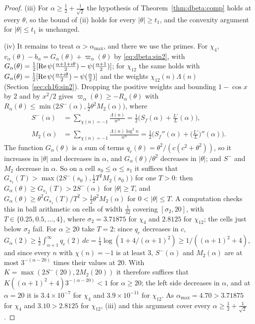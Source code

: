 \begin{proof}
(iii) For $\alpha\ge\frac12+\frac1{\sqrt2}$ the hypothesis of Theorem~\ref{thm:dbeta:comp} holds at every $\theta$, so the bound of (ii) holds for every $|\theta|\ge t_1$, and the convexity argument for $|\theta|\le t_1$ is unchanged.

(iv) It remains to treat $\alpha>\alpha_{\max}$, and there we use the primes. For $\chi_4$, $v_\alpha(\theta)-b_\alpha=G_\alpha(\theta)+\varpi_\alpha(\theta)$ by \eqref{eq:dbeta:sin2}, with $G_\alpha(\theta)=\frac12[\operatorname{Re}\psi(\frac{\alpha+1+i\theta}2)-\psi(\frac{\alpha+1}2)]$; for $\chi_{12}$ the same holds with $G_\alpha(\theta)=\frac12[\operatorname{Re}\psi(\frac{\alpha+i\theta}2)-\psi(\frac\alpha2)]$ and the weights $\chi_{12}(n)\Lambda(n)$ (Section~\ref{sec:ch16:sin2}). Dropping the positive weights and bounding $1-\cos x$ by $2$ and by $x^2/2$ gives $\varpi_\alpha(\theta)\ge-R_\alpha(\theta)$ with $R_\alpha(\theta)\le\min\big(2S^-(\alpha),\frac12\theta^2M_2(\alpha)\big)$, where
\begin{align*}
S^-(\alpha)&=\sum_{\chi(n)=-1}\frac{\Lambda(n)}{n^\alpha}=\frac12\Big(S_f(\alpha)+\frac{L'}L(\alpha)\Big),\\
M_2(\alpha)&=\sum_{\chi(n)=-1}\frac{\Lambda(n)\log^2n}{n^\alpha}=\frac12\Big(S_f''(\alpha)+\Big(\frac{L'}L\Big)''(\alpha)\Big).
\end{align*}
The function $G_\alpha(\theta)$ is a sum of terms $q_c(\theta)=\theta^2/(c(c^2+\theta^2))$, so it increases in $|\theta|$ and decreases in $\alpha$, and $G_\alpha(\theta)/\theta^2$ decreases in $|\theta|$; and $S^-$ and $M_2$ decrease in $\alpha$. So on a cell $s_0\le\alpha\le s_1$ it suffices that $G_{s_1}(T)>\max\big(2S^-(s_0),\frac12T^2M_2(s_0)\big)$ for one $T>0$: then $G_\alpha(\theta)\ge G_{s_1}(T)>2S^-(\alpha)$ for $|\theta|\ge T$, and $G_\alpha(\theta)\ge\theta^2G_{s_1}(T)/T^2>\frac12\theta^2M_2(\alpha)$ for $0<|\theta|\le T$. A computation checks this in ball arithmetic on cells of width $\frac1{32}$ covering $[\sigma_2,20]$, with $T\in\{0.25,0.5,\dots,4\}$, where $\sigma_2=3.71875$ for $\chi_4$ and $2.8125$ for $\chi_{12}$; the cells just below $\sigma_2$ fail. For $\alpha\ge20$ take $T=2$: since $q_c$ decreases in $c$, $G_\alpha(2)\ge\frac12\int_{\alpha+1}^\infty q_c(2)\,dc=\frac14\log(1+4/(\alpha+1)^2)\ge1/((\alpha+1)^2+4)$, and since every $n$ with $\chi(n)=-1$ is at least $3$, $S^-(\alpha)$ and $M_2(\alpha)$ are at most $3^{-(\alpha-20)}$ times their values at $20$. With $K=\max(2S^-(20),2M_2(20))$ it therefore suffices that $K((\alpha+1)^2+4)3^{-(\alpha-20)}<1$ for $\alpha\ge20$; the left side decreases in $\alpha$, and at $\alpha=20$ it is $3.4\times10^{-7}$ for $\chi_4$ and $3.9\times10^{-11}$ for $\chi_{12}$. As $\alpha_{\max}=4.70>3.71875$ for $\chi_4$ and $3.10>2.8125$ for $\chi_{12}$, (iii) and this argument cover every $\alpha\ge\frac12+\frac1{\sqrt2}$.


\end{proof}

